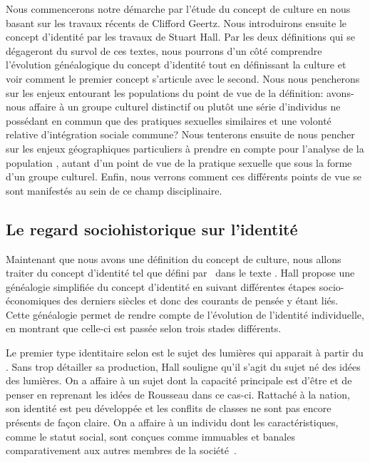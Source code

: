 Nous commencerons notre démarche par l'étude du concept de culture en nous basant sur les travaux récents de Clifford Geertz.
Nous introduirons ensuite le concept d'identité par les travaux de Stuart Hall.
Par les deux définitions qui se dégageront du survol de ces textes, nous pourrons d'un côté comprendre l'évolution généalogique du concept d'identité tout en définissant la culture et voir comment le premier concept s'articule avec le second.
Nous nous pencherons sur les enjeux entourant les populations \lgbt{} du point de vue de la définition: avons-nous affaire à un groupe culturel distinctif ou plutôt une série d'individus ne possédant en commun que des pratiques sexuelles similaires et une volonté relative d'intégration sociale commune?
Nous tenterons ensuite de nous pencher sur les enjeux géographiques particuliers à prendre en compte pour l'analyse de la population \lgbt{}, autant d'un point de vue de la pratique sexuelle que sous la forme d'un groupe culturel.
Enfin, nous verrons comment ces différents points de vue se sont manifestés au sein de ce champ disciplinaire.


\subsection{Le regard sociohistorique sur l'identité}
\label{sec:le_regard_sociohistoirique_sur_l_identit_} Maintenant que nous avons une définition du concept de culture, nous allons traiter du concept d'identité tel que défini par~\citet{Hall1996a} dans le texte .
Hall propose une généalogie simplifiée du concept d'identité en suivant différentes étapes socio-économiques des derniers siècles et donc des courants de pensée y étant liés.
Cette généalogie permet de rendre compte de l'évolution de l'identité individuelle, en montrant que celle-ci est passée selon trois stades différents.

Le premier type identitaire selon \citeauthor{Hall1996a} est le sujet des lumières qui apparait à partir du .
Sans trop détailler sa production, Hall souligne qu'il s'agit du sujet né des idées des lumières.
On a affaire à un sujet dont la capacité principale est d'être et de penser en reprenant les idées de Rousseau dans ce cas-ci.
Rattaché à la nation, son identité est peu développée et les conflits de classes ne sont pas encore présents de façon claire.
On a affaire à un individu dont les caractéristiques, comme le statut social, sont conçues comme immuables et banales comparativement aux autres membres de la société~\citeyearpar[596]{Hall1996a}.

